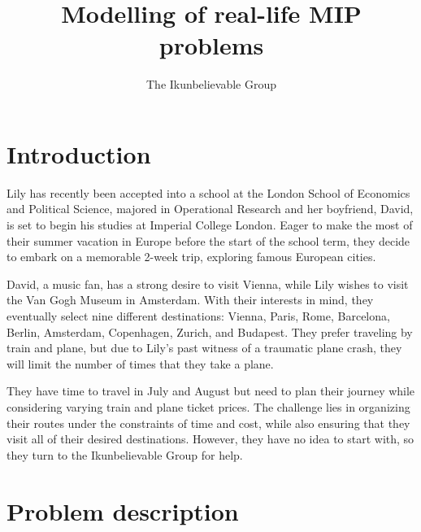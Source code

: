 \documentclass[11pt]{extarticle}
\title{Modelling of real-life MIP problems}
\author{The Ikunbelievable Group\footnotemark[1]}
\date{}
\begin{document}
\maketitle

\renewcommand{\thefootnote}{\fnsymbol{footnote}}
\renewcommand{\thefootnote}{\arabic{footnote}}

\section{Introduction}

Lily has recently been accepted into a school at the London School of Economics
and Political Science, majored in Operational Research and her boyfriend,
David, is set to begin his studies at Imperial College London. Eager to make
the most of their summer vacation in Europe before the start of the school
term, they decide to embark on a memorable 2-week trip, exploring famous
European cities.

David, a music fan, has a strong desire to visit Vienna, while Lily wishes to
visit the Van Gogh Museum in Amsterdam. With their interests in mind, they
eventually select nine different destinations: Vienna, Paris, Rome, Barcelona,
Berlin, Amsterdam, Copenhagen, Zurich, and Budapest. They prefer traveling by
train and plane, but due to Lily's past witness of a traumatic plane crash,
they will limit the number of times that they take a plane.

They have time to travel in July and August but need to plan their journey
while considering varying train and plane ticket prices. The challenge lies in
organizing their routes under the constraints of time and cost, while also
ensuring that they visit all of their desired destinations. However, they have
no idea to start with, so they turn to the Ikunbelievable Group for help.

\section{Problem description}
\end{document}
